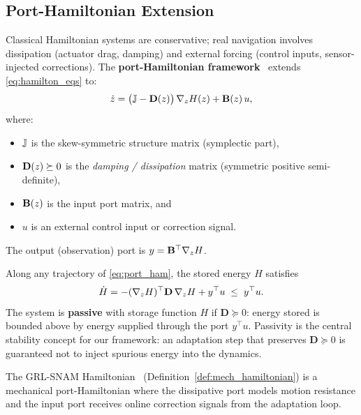\subsection{Port-Hamiltonian Extension}
\label{subsec:prelim:portham}

Classical Hamiltonian systems are conservative; real navigation involves
dissipation (actuator drag, damping) and external forcing (control inputs,
sensor-injected corrections).
The \textbf{port-Hamiltonian framework}~\citep{desai2021porthamiltonian}
extends \eqref{eq:hamilton_eqs} to:
\begin{equation}
  \dot{z}
  = \bigl(\mathbb{J} - \mathbf{D}(z)\bigr)\,\nabla_z H(z)
    + \mathbf{B}(z)\,u,
  \label{eq:port_ham}
\end{equation}
where:
\begin{itemize}
  \item $\mathbb{J}$ is the skew-symmetric structure matrix (symplectic part),
  \item $\mathbf{D}(z) \succeq 0$ is the \emph{damping / dissipation} matrix
        (symmetric positive semi-definite),
  \item $\mathbf{B}(z)$ is the input port matrix, and
  \item $u$ is an external control input or correction signal.
\end{itemize}
The output (observation) port is $y = \mathbf{B}^\top \nabla_z H$.

\begin{definition}
\label{def:passivity}
Along any trajectory of \eqref{eq:port_ham}, the stored energy $H$ satisfies
\begin{equation}
  \dot{H}
  = -(\nabla_z H)^\top \mathbf{D}\,\nabla_z H
    + y^\top u
  \;\leq\; y^\top u.
  \label{eq:energy_balance}
\end{equation}
The system is \textbf{passive} with storage function $H$ if
$\mathbf{D} \succeq 0$: energy stored is bounded above by energy
supplied through the port $y^\top u$.
Passivity is the central stability concept for our framework:
an adaptation step that preserves $\mathbf{D} \succeq 0$ is
guaranteed not to inject spurious energy into the dynamics.
\end{definition}

The GRL-SNAM Hamiltonian~\citep{ellendula2025grlsnam} (Definition~\ref{def:mech_hamiltonian}) is a
mechanical port-Hamiltonian where the dissipative port models motion
resistance and the input port receives online correction signals from
the adaptation loop.

